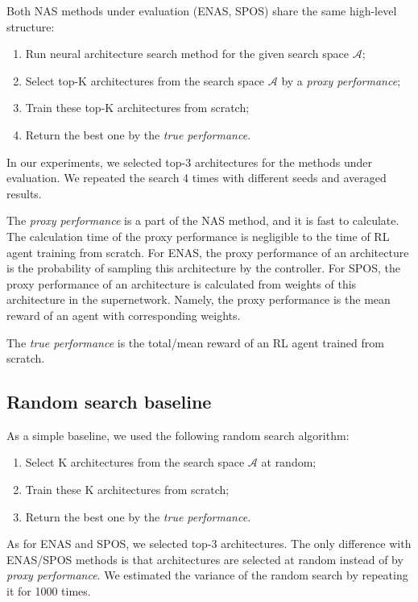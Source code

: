 \documentclass{svproc}
\begin{document}
Both NAS methods under evaluation (ENAS, SPOS) share the same high-level structure: 
\begin{enumerate}
\item Run neural architecture search method for the given search space $\mathcal{A}$;
\item Select top-K architectures from the search space $\mathcal{A}$ by a \textit{proxy performance};
\item Train these top-K architectures from scratch;
\item Return the best one by the \textit{true performance}. \end{enumerate}

In our experiments, we selected top-3 architectures for the methods under evaluation. We repeated the search 4 times with different seeds and averaged results.

The \textit{proxy performance} is a part of the NAS method, and it is fast to calculate. The calculation time of the proxy performance is negligible to the time of RL agent training from scratch. For ENAS, the proxy performance of an architecture is the probability of sampling this architecture by the controller. For SPOS, the proxy performance of an architecture is calculated from weights of this architecture in the supernetwork. Namely, the proxy performance is the mean reward of an agent with corresponding weights. 

The \textit{true performance} is the total/mean reward of an RL agent trained from scratch. 









\subsection{Random search baseline} 
As a simple baseline, we used the following random search algorithm:
\begin{enumerate}
\item Select K architectures from the search space $\mathcal{A}$ at random;
\item Train these K architectures from scratch;
\item Return the best one by the \textit{true performance}.
\end{enumerate}

As for ENAS and SPOS, we selected top-3 architectures.
The only difference with ENAS/SPOS methods is that architectures are selected at random instead of by \textit{proxy performance}.
We estimated the variance of the random search by repeating it for 1000 times.
\end{document}
